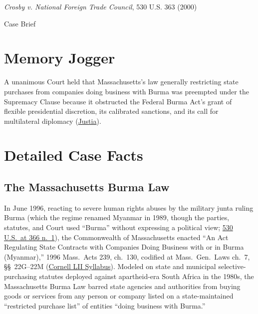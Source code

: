 \documentclass[12pt]{article}
\begin{document}
\begin{center}
{\LARGE \textit{Crosby v. National Foreign Trade Council}, 530 U.S. 363 (2000)\par}
\vspace{0.8em}
{\large Case Brief\par}
\end{center}
\vspace{1em}

\section{Memory Jogger}
A unanimous Court held that Massachusetts's law generally restricting state purchases from companies doing business with Burma was preempted under the Supremacy Clause because it obstructed the Federal Burma Act's grant of flexible presidential discretion, its calibrated sanctions, and its call for multilateral diplomacy (\href{https://supreme.justia.com/cases/federal/us/530/363/}{Justia}).

\section{Detailed Case Facts}
\subsection{The Massachusetts Burma Law}
In June 1996, reacting to severe human rights abuses by the military junta ruling Burma (which the regime renamed Myanmar in 1989, though the parties, statutes, and Court used ``Burma'' without expressing a political view; \href{https://supreme.justia.com/cases/federal/us/530/363/}{530 U.S.\ at 366 n.\ 1}), the Commonwealth of Massachusetts enacted ``An Act Regulating State Contracts with Companies Doing Business with or in Burma (Myanmar),'' 1996 Mass.\ Acts 239, ch.\ 130, codified at Mass.\ Gen.\ Laws ch.\ 7, \S\S~22G--22M (\href{https://www.law.cornell.edu/supct/html/99-474.ZS.html}{Cornell LII Syllabus}). Modeled on state and municipal selective-purchasing statutes deployed against apartheid-era South Africa in the 1980s, the Massachusetts Burma Law barred state agencies and authorities from buying goods or services from any person or company listed on a state-maintained ``restricted purchase list'' of entities ``doing business with Burma.''
\end{document}
